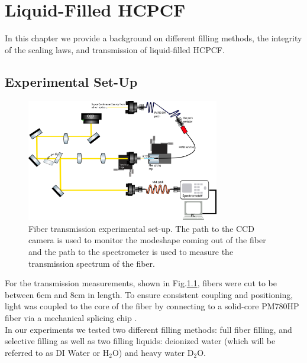 \chapter{Liquid-Filled HCPCF}
In this chapter we provide a background on different filling methods, the integrity of the scaling laws, and transmission of liquid-filled HCPCF.
\section{Experimental Set-Up}
\begin{figure}[!htb]
	\centering
	\includegraphics[width=0.75\textwidth]{./Figures/fiberfilling/Transmission_SetUp.png}
	\caption{Fiber transmission experimental set-up. The path to the CCD camera is used to monitor the modeshape coming out of the fiber and the path to the spectrometer is used to measure the transmission spectrum of the fiber.}
	\label{fig:filling exp}
\end{figure}
For the transmission measurements, shown in Fig.\ref{fig:filling exp}, fibers were cut to be between 6cm and 8cm in length. To ensure consistent coupling and positioning, light was coupled to the core of the fiber by connecting to a solid-core PM780HP fiber via a mechanical splicing chip \cite{maruf}.\\
In our experiments we tested two different filling methods: full fiber filling, and selective filling as well as two filling liquids: deionized water (which will be referred to as DI Water or H${}_2$O) and heavy water D${}_2$O.
